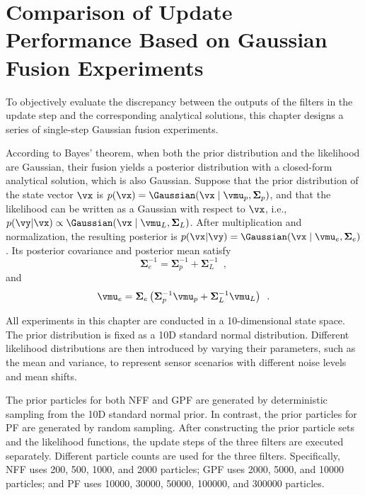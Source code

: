 \chapter{Comparison of Update Performance Based on Gaussian Fusion Experiments}
\label{ch:gaussian_fusion}

To objectively evaluate the discrepancy between the outputs of the filters in the update step and the corresponding analytical solutions, this chapter designs a series of single-step Gaussian fusion experiments.

According to Bayes' theorem, when both the prior distribution and the likelihood are Gaussian, their fusion yields a posterior distribution with a closed-form analytical solution, which is also Gaussian. Suppose that the prior distribution of the state vector $\vx$ is $p(\vx) = \Gaussian(\vx \mid \vmu_p, \boldsymbol{\Sigma}_p)$, and that the likelihood can be written as a Gaussian with respect to $\vx$, i.e., $p(\vy|\vx) \propto \Gaussian(\vx \mid \vmu_L, \boldsymbol{\Sigma}_L)$. After multiplication and normalization, the resulting posterior is $p(\vx|\vy) = \Gaussian(\vx \mid \vmu_e, \boldsymbol{\Sigma}_e)$. Its posterior covariance and posterior mean satisfy \cite[Section~8.1.8]{MC}
\begin{equation}
	\boldsymbol{\Sigma}_e^{-1} = \boldsymbol{\Sigma}_p^{-1} + \boldsymbol{\Sigma}_L^{-1} \enspace ,
\end{equation}
and
\begin{equation}
	\vmu_e = \boldsymbol{\Sigma}_e \left( \boldsymbol{\Sigma}_p^{-1} \vmu_p + \boldsymbol{\Sigma}_L^{-1} \vmu_L \right) \enspace .
\end{equation}

All experiments in this chapter are conducted in a 10-dimensional state space. The prior distribution is fixed as a 10D standard normal distribution. Different likelihood distributions are then introduced by varying their parameters, such as the mean and variance, to represent sensor scenarios with different noise levels and mean shifts.

The prior particles for both NFF and GPF are generated by deterministic sampling from the 10D standard normal prior. In contrast, the prior particles for PF are generated by random sampling. After constructing the prior particle sets and the likelihood functions, the update steps of the three filters are executed separately. Different particle counts are used for the three filters. Specifically, NFF uses 200, 500, 1000, and 2000 particles; GPF uses 2000, 5000, and 10000 particles; and PF uses 10000, 30000, 50000, 100000, and 300000 particles.

